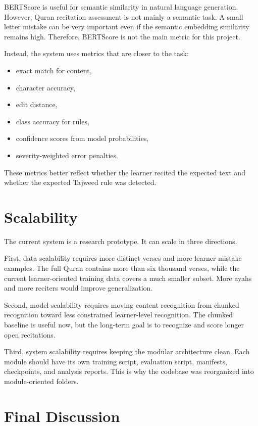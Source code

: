 BERTScore is useful for semantic similarity in natural language generation.
However, Quran recitation assessment is not mainly a semantic task. A small
letter mistake can be very important even if the semantic embedding similarity
remains high. Therefore, BERTScore is not the main metric for this project.

Instead, the system uses metrics that are closer to the task:

\begin{itemize}[leftmargin=*]
    \item exact match for content,
    \item character accuracy,
    \item edit distance,
    \item class accuracy for rules,
    \item confidence scores from model probabilities,
    \item severity-weighted error penalties.
\end{itemize}

These metrics better reflect whether the learner recited the expected text and
whether the expected Tajweed rule was detected.

\section{Scalability}

The current system is a research prototype. It can scale in three directions.

First, data scalability requires more distinct verses and more learner mistake
examples. The full Quran contains more than six thousand verses, while the
current learner-oriented training data covers a much smaller subset. More ayahs
and more reciters would improve generalization.

Second, model scalability requires moving content recognition from chunked
recognition toward less constrained learner-level recognition. The chunked
baseline is useful now, but the long-term goal is to recognize and score longer
open recitations.

Third, system scalability requires keeping the modular architecture clean. Each
module should have its own training script, evaluation script, manifests,
checkpoints, and analysis reports. This is why the codebase was reorganized into
module-oriented folders.

\section{Final Discussion}

